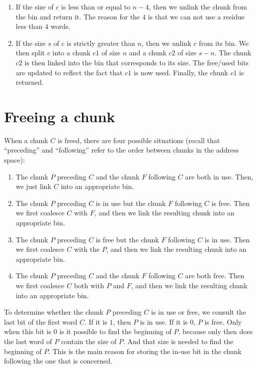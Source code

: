 \begin{enumerate}
\item If the size of $c$ is less than or equal to $n-4$, then we
  unlink the chunk from the bin and return it.  The reason for the $4$
  is that we can not use a residue less than $4$ words.
\item If the size $s$ of $c$ is strictly greater than $n$, then we
  unlink $c$ from its bin.  We then split $c$ into a chunk $c1$ of
  size $n$ and a chunk $c2$ of size $s-n$.  The chunk $c2$ is then
  linked into the bin that corresponds to its size.  The free/used
  bits are updated to reflect the fact that $c1$ is now used.
  Finally, the chunk $c1$ is returned.
\end{enumerate}

\section{Freeing a chunk}

When a chunk $C$ is freed, there are four possible situations (recall
that ``preceding'' and ``following'' refer to the order between chunks
in the address space):

\begin{enumerate}
\item The chunk $P$ preceding $C$ and the chunk $F$ following $C$
  are both in use.  Then, we just link $C$ into an appropriate
  bin.
\item The chunk $P$ preceding $C$ is in use but the chunk $F$
  following $C$ is free.  Then we first coalesce $C$ with $F$, and
  then we link the resulting chunk into an appropriate bin.
\item The chunk $P$ preceding $C$ is free but the chunk $F$ following
  $C$ is in use.  Then we first coalesce $C$ with the $P$, and then we
  link the resulting chunk into an appropriate bin.
\item The chunk $P$ preceding $C$ and the chunk $F$ following $C$ are
  both free.  Then we first coalesce $C$ both with $P$ and $F$, and
  then we link the resulting chunk into an appropriate bin.
\end{enumerate}

To determine whether the chunk $P$ preceding $C$ is in use or free, we
consult the last bit of the first word $C$.  If it is $1$, then
$P$ is in use.  If it is $0$, $P$ is free.  Only when this bit is $0$ is
it possible to find the beginning of $P$, because only then does the
last word of $P$ contain the size of $P$.  And that size is needed to
find the beginning of $P$.  This is the main reason for storing the
in-use bit in the chunk following the one that is concerned.

